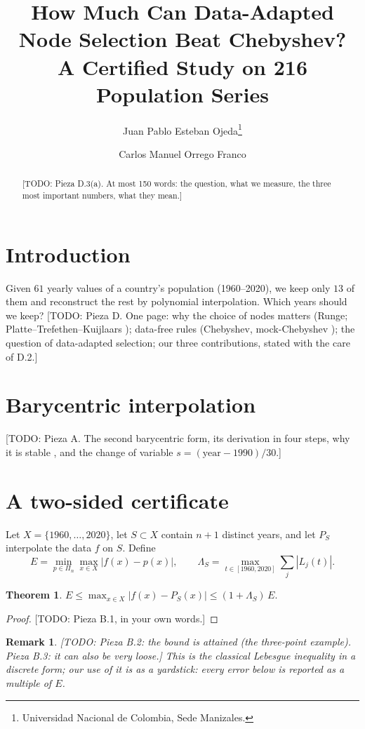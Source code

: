 \documentclass[11pt]{article}
\title{How Much Can Data-Adapted Node Selection Beat Chebyshev?\\
\large A Certified Study on 216 Population Series}
\author{Juan Pablo Esteban Ojeda\thanks{Universidad Nacional de Colombia, Sede Manizales.}
\and Carlos Manuel Orrego Franco\footnotemark[1]}
\date{\todo{date}}
\newtheorem{theorem}{Theorem}
\newtheorem{remark}{Remark}
\newcommand{\todo}[1]{\textcolor{red!70!black}{[TODO: #1]}}
\begin{document}
\maketitle

\begin{abstract}
\todo{Pieza D.3(a). At most 150 words: the question, what we measure, the three most important numbers, what they mean.}
\end{abstract}

\section{Introduction}
Given $61$ yearly values of a country's population (1960--2020), we keep only $13$ of them and reconstruct the rest by polynomial interpolation. Which years should we keep?
\todo{Pieza D. One page: why the choice of nodes matters (Runge; Platte--Trefethen--Kuijlaars \cite{ptk2011}); data-free rules (Chebyshev, mock-Chebyshev \cite{boydxu2009}); the question of data-adapted selection; our three contributions, stated with the care of D.2.}

\section{Barycentric interpolation}\label{sec:bary}
\todo{Pieza A. The second barycentric form, its derivation in four steps, why it is stable \cite{berruttrefethen2004,higham2004}, and the change of variable $s=(\text{year}-1990)/30$.}

\section{A two-sided certificate}\label{sec:cert}
Let $X=\{1960,\dots,2020\}$, let $S\subset X$ contain $n+1$ distinct years, and let $P_S$ interpolate the data $f$ on $S$. Define
\[
E=\min_{p\in\Pi_n}\max_{x\in X}|f(x)-p(x)|,\qquad
\Lambda_S=\max_{t\in[1960,2020]}\sum_j|L_j(t)|.
\]
\begin{theorem}\label{thm:L}
$E\le \max_{x\in X}|f(x)-P_S(x)|\le(1+\Lambda_S)\,E.$
\end{theorem}
\begin{proof}
\todo{Pieza B.1, in your own words.}
\end{proof}
\begin{remark}
\todo{Pieza B.2: the bound is attained (the three-point example). Pieza B.3: it can also be very loose.}
This is the classical Lebesgue inequality \cite{trefethen2013} in a discrete form; our use of it is as a yardstick: every error below is reported as a multiple of $E$.
\end{remark}
\end{document}
